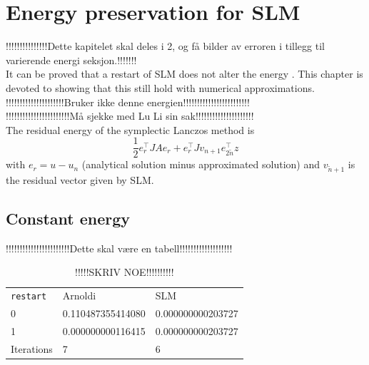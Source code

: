 \chapter{Energy preservation for SLM }
!!!!!!!!!!!!!!!Dette kapitelet skal deles i 2, og få bilder av erroren i tillegg til varierende energi seksjon.!!!!!!!\\
It can be proved that a restart of SLM does not alter the energy \cite{luli}. This chapter is devoted to showing that this still hold with numerical approximations. \\

!!!!!!!!!!!!!!!!!!!!!Bruker ikke denne energien!!!!!!!!!!!!!!!!!!!!!!!!\\
!!!!!!!!!!!!!!!!!!!!!!!Må sjekke med Lu Li sin sak!!!!!!!!!!!!!!!!!!!!!\\
The residual energy of the symplectic Lanczos method is
\begin{equation}
\frac{1}{2} e_r^{\top} J A e_r + e_r^\top J v_{n+1} e_{2\tilde{n}}^\top z
\end{equation}
with $ e_r = u-u_n $ (analytical solution minus approximated solution) and $v_{\tilde{n}+1}$ is the residual vector given by SLM. 

\section{Constant energy}



!!!!!!!!!!!!!!!!!!!!!!!Dette skal være en tabell!!!!!!!!!!!!!!!!!!!\\
\begin{table}
\centering
\begin{tabular}{l l l}
\texttt{restart} & Arnoldi & SLM  \\
0 & 0.110487355414080 & 0.000000000203727 \\
1 & 0.000000000116415 & 0.000000000203727 \\
Iterations & 7 & 6 \\
\end{tabular}
\caption{!!!!!SKRIV NOE!!!!!!!!!!}
\label{tab:SLMCE}
\end{table}

